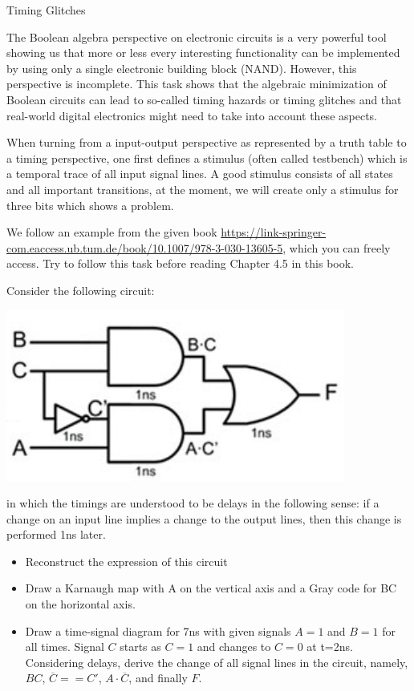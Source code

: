 \begin{task}{Timing Glitches}{}{}

  The Boolean algebra perspective on electronic circuits is a very powerful tool showing us that
  more or less every interesting functionality can be implemented by using only a single electronic
  building block (NAND). However, this perspective is incomplete. This task shows that the algebraic minimization
  of Boolean circuits can lead to so-called timing hazards or timing glitches and that real-world
  digital electronics might need to take into account these aspects.

  When turning from a input-output perspective as represented by a truth table to a timing perspective, one
  first defines a stimulus (often called testbench) which is a temporal trace of all input signal lines. A good
  stimulus consists of all states and all important transitions, at the moment, we will create only a stimulus
  for three bits which shows a problem.

  We follow an example from the given book \url{https://link-springer-com.eaccess.ub.tum.de/book/10.1007/978-3-030-13605-5}, which you can freely access. Try to follow this task before reading Chapter 4.5 in this book.

  Consider the following circuit:

  \includegraphics[width=.5\textwidth]{gfx/circuit_timingglitch.png}

  in which the timings are understood to be delays in the following sense: if a change on an input line implies
  a change to the output lines, then this change is performed 1ns later. 
  
  \begin{itemize}
  \item{Reconstruct the expression of this circuit}
  \item{Draw a Karnaugh map with A on the vertical axis and a Gray code for BC on the horizontal axis.}
  \item{Draw a time-signal diagram for 7ns with given signals $A =1$ and $B=1$ for all times. Signal $C$ starts
    as $C=1$ and changes to $C=0$ at t=2ns. Considering delays, derive the change of all signal lines in the circuit, namely, $BC$, $\overline{C} == C'$, $A\cdot \overline{C}$, and finally $F$.

}
\end{itemize}
\end{task}
